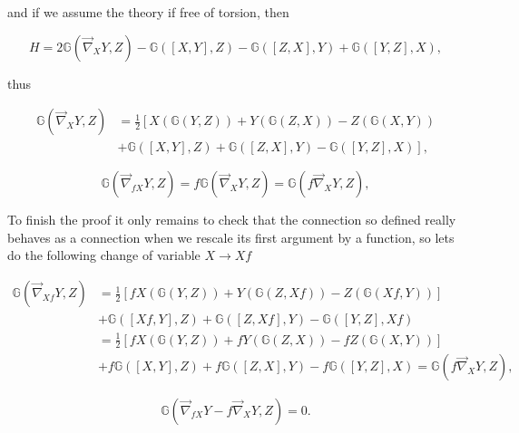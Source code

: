         and if we assume the theory if free of torsion, then

        \begin{equation}
            H = 2\mathbb{G}\left(\Vec{\nabla}_XY,Z \right) - \mathbb{G}\left([X,Y],Z\right) - \mathbb{G}\left([Z,X],Y\right) + \mathbb{G}\left([Y,Z],X\right),
        \end{equation}

        thus

        \begin{align}
            \mathbb{G}\left(\Vec{\nabla}_XY,Z \right) &= \frac{1}{2}\left[X\left(\mathbb{G}(Y,Z)\right) + Y\left(\mathbb{G}(Z,X)\right)  - Z\left(\mathbb{G}(X,Y)\right) \right. \\
            &\left. + \mathbb{G}\left([X,Y],Z\right) + \mathbb{G}\left([Z,X],Y\right) - \mathbb{G}\left([Y,Z],X\right)\right],
        \end{align}

        \begin{equation}
            \mathbb{G}\left(\Vec{\nabla}_{fX}Y,Z \right) = f\mathbb{G}\left(\Vec{\nabla}_XY,Z\right) = \mathbb{G}\left(f\Vec{\nabla}_XY,Z\right),
        \end{equation}

        To finish the proof it only remains to check that the connection so defined really behaves as a connection when we rescale its first argument by a function, so lets do the following change of variable $X \rightarrow Xf$

        \begin{align*}
            \mathbb{G}\left(\Vec{\nabla}_{Xf}Y,Z \right) &= \frac{1}{2}\left[fX\left(\mathbb{G}(Y,Z) \right) + Y \left(\mathbb{G}(Z,Xf)\right) - Z\left(\mathbb{G}(Xf,Y)\right)\right]\\
            &+\mathbb{G}\left([Xf,Y],Z \right) + \mathbb{G}\left([Z,Xf],Y\right)- \mathbb{G}\left([Y,Z],Xf \right)\\
            &= \frac{1}{2}\left[fX\left(\mathbb{G}(Y,Z) \right) + fY \left(\mathbb{G}(Z,X)\right) - fZ\left(\mathbb{G}(X,Y)\right)\right]\\
            &+f\mathbb{G}\left([X,Y],Z \right) + f\mathbb{G}\left([Z,X],Y\right)- f\mathbb{G}\left([Y,Z],X \right) = \mathbb{G}\left(f\Vec{\nabla}_XY,Z\right),
        \end{align*}

        \begin{equation}
            \mathbb{G}\left(\Vec{\nabla}_{fX}Y-f\Vec{\nabla}_XY,Z\right) = 0.
        \end{equation}

